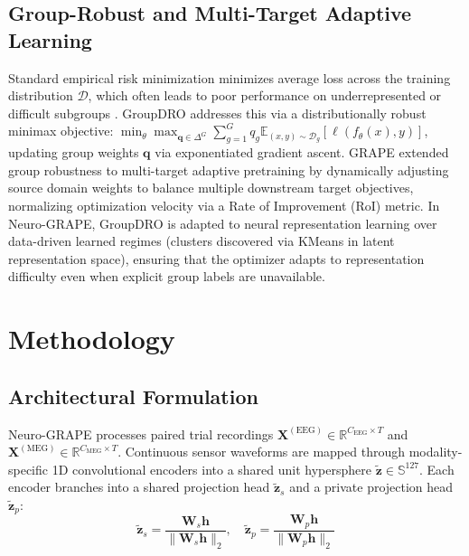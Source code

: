 \documentclass[conference]{IEEEtran}
\begin{document}
\subsection{Group-Robust and Multi-Target Adaptive Learning}
Standard empirical risk minimization minimizes average loss across the training distribution $\mathcal{D}$, which often leads to poor performance on underrepresented or difficult subgroups \cite{sagawa2020groupdro}. GroupDRO \cite{sagawa2020groupdro} addresses this via a distributionally robust minimax objective:
$\min_{\theta} \max_{\mathbf{q} \in \Delta^G} \sum_{g=1}^G q_g \mathbb{E}_{(x, y) \sim \mathcal{D}_g} [\ell(f_\theta(x), y)]$,
updating group weights $\mathbf{q}$ via exponentiated gradient ascent. GRAPE \cite{wu2025grape} extended group robustness to multi-target adaptive pretraining by dynamically adjusting source domain weights to balance multiple downstream target objectives, normalizing optimization velocity via a Rate of Improvement (RoI) metric. In Neuro-GRAPE, GroupDRO is adapted to neural representation learning over data-driven learned regimes (clusters discovered via KMeans in latent representation space), ensuring that the optimizer adapts to representation difficulty even when explicit group labels are unavailable.

\section{Methodology}

\subsection{Architectural Formulation}
Neuro-GRAPE processes paired trial recordings $\mathbf{X}^{(\text{EEG})} \in \mathbb{R}^{C_{\text{EEG}} \times T}$ and $\mathbf{X}^{(\text{MEG})} \in \mathbb{R}^{C_{\text{MEG}} \times T}$. Continuous sensor waveforms are mapped through modality-specific 1D convolutional encoders into a shared unit hypersphere $\tilde{\mathbf{z}} \in \mathbb{S}^{127}$. Each encoder branches into a shared projection head $\tilde{\mathbf{z}}_s$ and a private projection head $\tilde{\mathbf{z}}_p$:
\begin{equation}
\tilde{\mathbf{z}}_s = \frac{\mathbf{W}_s \mathbf{h}}{\|\mathbf{W}_s \mathbf{h}\|_2}, \quad \tilde{\mathbf{z}}_p = \frac{\mathbf{W}_p \mathbf{h}}{\|\mathbf{W}_p \mathbf{h}\|_2}
\end{equation}
\end{document}
